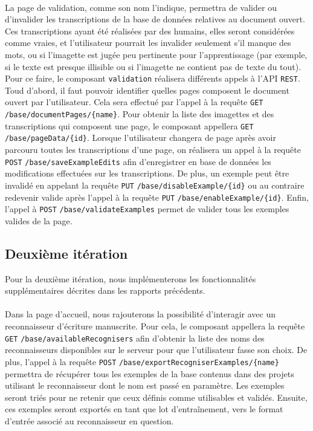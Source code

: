 \paragraph{}
La page de validation, comme son nom l’indique, permettra de valider ou d’invalider les transcriptions de la base de données relatives au document ouvert. Ces transcriptions ayant été réalisées par des humains, elles seront considérées comme vraies, et l’utilisateur pourrait les invalider seulement s’il manque des mots, ou si l’imagette est jugée peu pertinente pour l’apprentissage (par exemple, si le texte est presque illisible ou si l’imagette ne contient pas de texte du tout).
\newline{}
Pour ce faire, le composant \texttt{validation} réalisera différents appels à l'API \texttt{REST}. Toud d'abord, il faut pouvoir identifier quelles pages composent le document ouvert par l'utilisateur. Cela sera effectué par l'appel à la requête \texttt{GET} \texttt{/base/documentPages/\{name\}}. Pour obtenir la liste des imagettes et des transcriptions qui composent une page, le composant appellera \texttt{GET} \texttt{/base/pageData/\{id\}}. Lorsque l'utilisateur changera de page après avoir parcouru toutes les transcriptions d'une page, on réalisera un appel à la requête \texttt{POST} \texttt{/base/saveExampleEdits} afin d'enregistrer en base de données les modifications effectuées sur les transcriptions. De plus, un exemple peut être invalidé en appelant la requête \texttt{PUT} \texttt{/base/disableExample/\{id\}} ou au contraire redevenir valide après l'appel à la requête \texttt{PUT} \texttt{/base/enableExample/\{id\}}. Enfin, l'appel à \texttt{POST} \texttt{/base/validateExamples} permet de valider tous les exemples valides de la page.


\newpage{}

\subsection{Deuxième itération}

Pour la deuxième itération, nous implémenterons les fonctionnalités supplémentaires décrites dans les rapports précédents.

\paragraph{}
Dans la page d'accueil, nous rajouterons la possibilité d'interagir avec un reconnaisseur d'écriture manuscrite. Pour cela, le composant appellera la requête \texttt{GET} \texttt{/base/availableRecognisers} afin d'obtenir la liste des noms des reconnaisseurs disponibles sur le serveur pour que l'utilisateur fasse son choix. De plus, l'appel à la requête \texttt{POST} \texttt{/base/exportRecogniserExamples/\{name\}} permettra de récupérer tous les exemples de la base contenus dans des projets utilisant le reconnaisseur dont le nom est passé en paramètre. Les exemples seront triés pour ne retenir que ceux définis comme utilisables et validés. Ensuite, ces exemples seront exportés en tant que lot d'entraînement, vers le format d'entrée associé au reconnaisseur en question.

